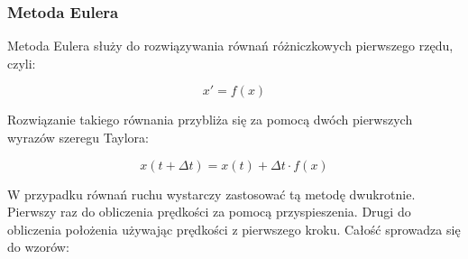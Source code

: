 
\subsubsection {Metoda Eulera}

Metoda Eulera służy do rozwiązywania równań różniczkowych pierwszego rzędu, czyli:

$$x' = f(x)$$

Rozwiązanie takiego równania przybliża się za pomocą dwóch pierwszych wyrazów szeregu Taylora:

$$x(t+\Delta t) = x(t) + \Delta t \cdot f(x)$$

W przypadku równań ruchu wystarczy zastosować tą metodę dwukrotnie. Pierwszy raz do obliczenia prędkości za pomocą przyspieszenia. Drugi do obliczenia położenia używając prędkości z pierwszego kroku. Całość sprowadza się do wzorów:

\begin{center}

\end{center}

